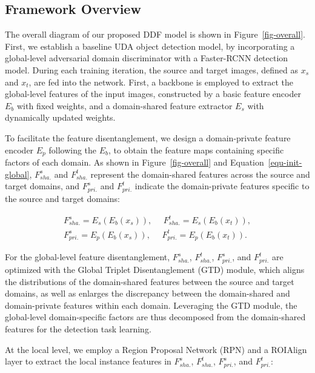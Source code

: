 \documentclass[journal]{IEEEtran}
\begin{document}
\subsection{Framework Overview~\label{sec-overall}}



The overall diagram of our proposed DDF model is shown in Figure~\ref{fig-overall}. First, we establish a baseline UDA object detection model, by incorporating a global-level adversarial domain discriminator with a Faster-RCNN detection model. During each training iteration, the source and target images, defined as $x_{s}$ and $x_{t}$, are fed into the network. First, a backbone is employed to extract the global-level features of the input images, constructed by a basic feature encoder $E_{b}$ with fixed weights, and a domain-shared feature extractor $E_{s}$ with dynamically updated weights. 



To facilitate the feature disentanglement, we design a domain-private feature encoder $E_{p}$ following the $E_{b}$, to obtain the feature maps containing specific factors of each domain. As shown in Figure~\ref{fig-overall} and Equation~\ref{equ-init-global}, $F_{sha.}^{s}$ and $F_{sha.}^{t}$ represent the domain-shared features across the source and target domains, and $F_{pri.}^{s}$ and $F_{pri.}^{t}$ indicate the domain-private features specific to the source and target domains:

\begin{equation}
\begin{aligned}
F_{sha.}^{s}= E_{s}(E_{b}(x_{s})), ~~~~~~   F_{sha.}^{t} = E_{s}(E_{b}(x_{t})),  \\
F_{pri.}^{s} = E_{p}(E_{b}(x_{s})),   ~~~~~~   F_{pri.}^{t} = E_{p}(E_{b}(x_{t})).
\label{equ-init-global}
\end{aligned}
\end{equation}


For the global-level feature disentanglement, $F_{sha.}^{s}$, $F_{sha.}^{t}$, $F_{pri.}^{s}$, and $F_{pri.}^{t}$ are optimized with the Global Triplet Disentanglement (GTD) module, which aligns the distributions of the domain-shared features between the source and target domains, as well as enlarges the discrepancy between the domain-shared and domain-private features within each domain. Leveraging the GTD module, the global-level domain-specific factors are thus decomposed from the domain-shared features for the detection task learning. 

At the local level, we employ a Region Proposal Network (RPN) and a ROIAlign layer to extract the local instance features in $F_{sha.}^{s}$, $F_{sha.}^{t}$, $F_{pri.}^{s}$, and $F_{pri.}^{t}$:
\end{document}

